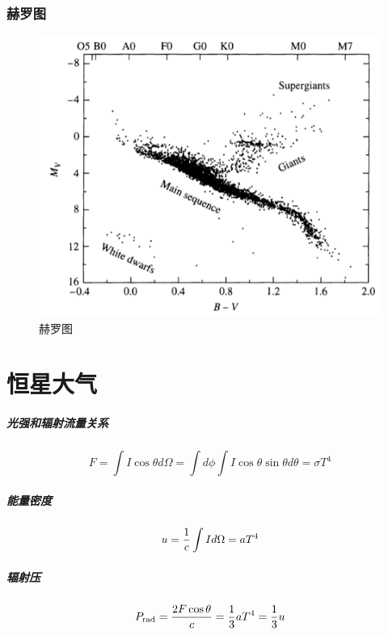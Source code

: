 \documentclass[openany]{ctexbook}
\begin{document}
\subsection{赫罗图}
\begin{figure}[hbt]
  \centering
  \includegraphics[width=14cm]{chapters/08/HRD}
  \caption{赫罗图}
  \label{}
\end{figure}

\chapter{恒星大气}
\paragraph{光强和辐射流量关系}
\begin{equation}
  F=\int I \cos\theta d\Omega=\int d\phi\int I \cos\theta\sin\theta d\theta =\sigma T^4
\end{equation}

\paragraph{能量密度}
\begin{equation}
  u={1\over c}\int I d\Omega=aT^4
\end{equation}

\paragraph{辐射压}
\begin{equation}
  P_\mathrm{rad}={2F \cos{\theta}\over c}={1\over3}aT^4={1\over 3}u
\end{equation}
\end{document}
